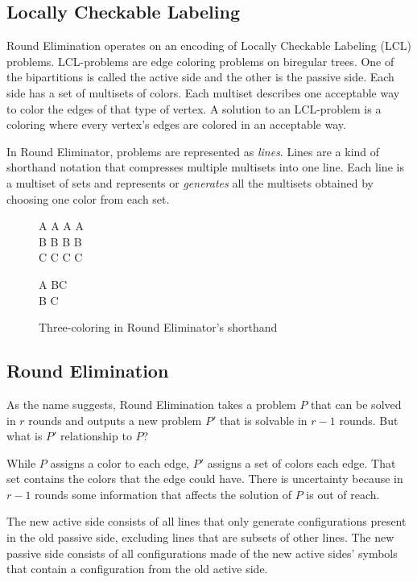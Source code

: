 \documentclass[english, 12pt, a4paper, sci, utf8, a-1b, online]{aaltothesis}
\begin{document}
\subsection{Locally Checkable Labeling}

Round Elimination operates on an encoding of Locally Checkable Labeling (LCL) problems. LCL-problems are edge coloring problems on biregular trees. One of the bipartitions is called the active side and the other is the passive side. Each side has a set of multisets of colors. Each multiset describes one acceptable way to color the edges of that type of vertex. A solution to an LCL-problem is a coloring where every vertex's edges are colored in an acceptable way.

In Round Eliminator, problems are represented as \emph{lines}. Lines are a kind of shorthand notation that compresses multiple multisets into one line. Each line is a multiset of sets and represents or \emph{generates} all the multisets obtained by choosing one color from each set.\cite{RE}

\begin{figure}[h]
\centering
\begin{tcolorbox}[width=.2\textwidth, nobeforeafter, title=active side]
A A A A \\
B B B B \\
C C C C
\end{tcolorbox}
\begin{tcolorbox}[width=.2\textwidth, nobeforeafter, title=passive side]
A BC \\
B C
\end{tcolorbox}
\caption{Three-coloring in Round Eliminator's shorthand}
\end{figure}

\subsection{Round Elimination}

As the name suggests, Round Elimination takes a problem $P$ that can be solved in $r$ rounds and outputs a new problem $P'$ that is solvable in $r-1$ rounds. But what is $P'$ relationship to $P$?

While $P$ assigns a color to each edge, $P'$ assigns a set of colors each edge. That set contains the colors that the edge could have. There is uncertainty because in $r-1$ rounds some information that affects the solution of $P$ is out of reach.

The new active side consists of all lines that only generate configurations present in the old passive side, excluding lines that are subsets of other lines. The new passive side consists of all configurations made of the new active sides' symbols that contain a configuration from the old active side.\cite{DA2020}
\end{document}
